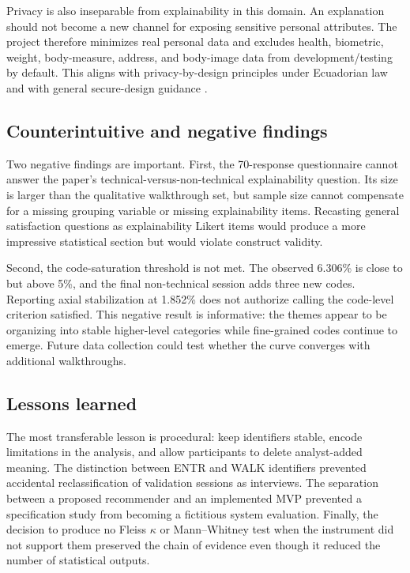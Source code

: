 \documentclass[pdflatex,sn-basic]{sn-jnl}
\begin{document}
Privacy is also inseparable from explainability in this domain. An explanation should not become a new channel for exposing sensitive personal attributes. The project therefore minimizes real personal data and excludes health, biometric, weight, body-measure, address, and body-image data from development/testing by default. This aligns with privacy-by-design principles under Ecuadorian law and with general secure-design guidance \cite{lopdp2021,spdp2025,owasp2025,nist2025}.

\subsection{Counterintuitive and negative findings}
Two negative findings are important. First, the 70-response questionnaire cannot answer the paper's technical-versus-non-technical explainability question. Its size is larger than the qualitative walkthrough set, but sample size cannot compensate for a missing grouping variable or missing explainability items. Recasting general satisfaction questions as explainability Likert items would produce a more impressive statistical section but would violate construct validity.

Second, the code-saturation threshold is not met. The observed 6.306\% is close to but above 5\%, and the final non-technical session adds three new codes. Reporting axial stabilization at 1.852\% does not authorize calling the code-level criterion satisfied. This negative result is informative: the themes appear to be organizing into stable higher-level categories while fine-grained codes continue to emerge. Future data collection could test whether the curve converges with additional walkthroughs.

\subsection{Lessons learned}
The most transferable lesson is procedural: keep identifiers stable, encode limitations in the analysis, and allow participants to delete analyst-added meaning. The distinction between ENTR and WALK identifiers prevented accidental reclassification of validation sessions as interviews. The separation between a proposed recommender and an implemented MVP prevented a specification study from becoming a fictitious system evaluation. Finally, the decision to produce no Fleiss $\kappa$ or Mann--Whitney test when the instrument did not support them preserved the chain of evidence even though it reduced the number of statistical outputs.
\end{document}
